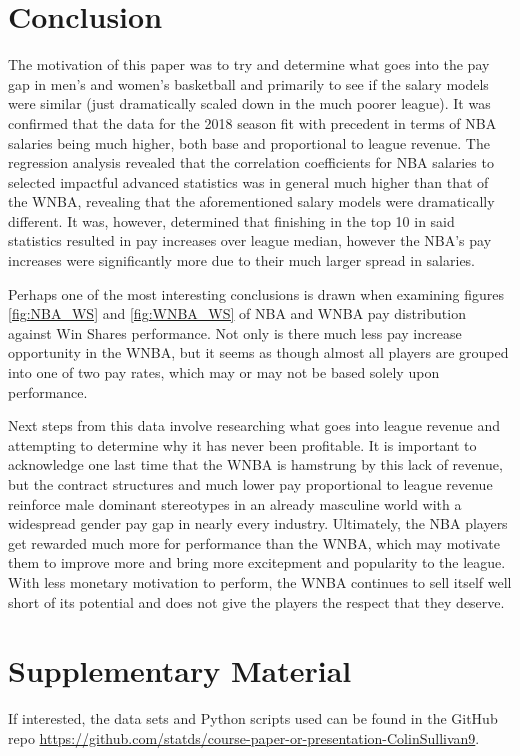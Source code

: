 \documentclass[12pt, titlepage]{article}
\begin{document}
\section{Conclusion}
\hspace*{10mm}
The motivation of this paper was to try and determine what goes into the pay gap in men’s and women’s basketball and primarily to see if the salary 
models were similar (just dramatically scaled down in the much poorer league). It was confirmed that the data for the 2018 season fit with precedent 
in terms of NBA salaries being much higher, both base and proportional to league revenue. The regression analysis revealed that the correlation 
coefficients for NBA salaries to selected impactful advanced statistics was in general much higher than that of the WNBA, revealing that the 
aforementioned salary models were dramatically different. It was, however, determined that finishing in the top 10 in said statistics resulted in pay 
increases over league median, however the NBA’s pay increases were significantly more due to their much larger spread in salaries. 
\par
Perhaps one of the most interesting conclusions is drawn when examining figures \ref{fig:NBA_WS} and \ref{fig:WNBA_WS} of NBA and WNBA pay distribution against Win Shares performance. 
Not only is there much less pay increase opportunity in the WNBA, but it seems as though almost all players are grouped into one of two pay rates, 
which may or may not be based solely upon performance.
\par
Next steps from this data involve researching what goes into league revenue and attempting to determine why it has never been profitable. 
It is important to acknowledge one last time that the WNBA is hamstrung by this lack of revenue, but the contract structures and much lower 
pay proportional to league revenue reinforce male dominant stereotypes in an already masculine world with a widespread gender pay gap in nearly
every industry. Ultimately, the NBA players get rewarded much more for performance than the WNBA, which may motivate them to improve more and bring 
more excitepment and popularity to the league. With less monetary motivation to perform, the WNBA continues to sell itself well short of its potential 
and does not give the players the respect that they deserve. 

\section{Supplementary Material}
If interested, the data sets and Python scripts used can be found in the GitHub repo \url{https://github.com/statds/course-paper-or-presentation-ColinSullivan9}.



\end{document}
